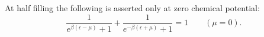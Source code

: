 \documentclass{article}
\begin{document}
At half filling the following is asserted only at zero chemical potential:
\begin{equation}
\frac{1}{e^{\beta(\epsilon-\mu)}+1}+\frac{1}{e^{-\beta(\epsilon+\mu)}+1}=1
\qquad (\mu=0).\label{conditional}
\end{equation}
\end{document}
